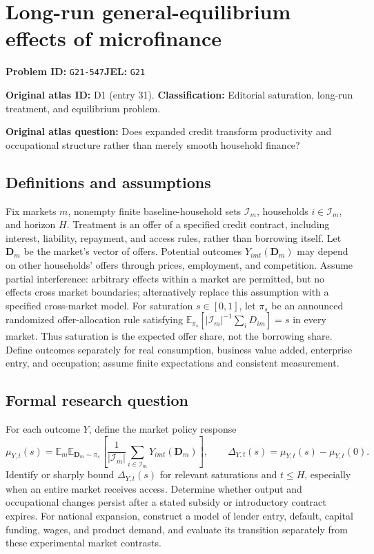 \documentclass[11pt,a4paper]{article}
\begin{document}
\section*{Long-run general-equilibrium effects of microfinance}
\textbf{Problem ID:} \texttt{G21-547}\quad \textbf{JEL:} \texttt{G21}\par
\label{problem:OP-0031}
\label{atlas:prob:D1}
\noindent\textbf{Original atlas ID:} D1 (entry 31). \textbf{Classification:} Editorial saturation, long-run treatment, and equilibrium problem.

\noindent\textbf{Original atlas question:} Does expanded credit transform productivity and occupational structure rather than merely smooth household finance?

\subsection*{Definitions and assumptions}
Fix markets $m$, nonempty finite baseline-household sets $\mathcal I_m$, households $i\in\mathcal I_m$, and horizon $H$. Treatment is an offer of a specified credit contract, including interest, liability, repayment, and access rules, rather than borrowing itself. Let $\mathbf D_m$ be the market's vector of offers. Potential outcomes $Y_{imt}(\mathbf D_m)$ may depend on other households' offers through prices, employment, and competition. Assume partial interference: arbitrary effects within a market are permitted, but no effects cross market boundaries; alternatively replace this assumption with a specified cross-market model. For saturation $s\in[0,1]$, let $\pi_s$ be an announced randomized offer-allocation rule satisfying $\mathbb E_{\pi_s}[|\mathcal I_m|^{-1}\sum_i D_{im}]=s$ in every market. Thus saturation is the expected offer share, not the borrowing share. Define outcomes separately for real consumption, business value added, enterprise entry, and occupation; assume finite expectations and consistent measurement.
\subsection*{Formal research question}
For each outcome $Y$, define the market policy response
\[
 \mu_{Y,t}(s)=\mathbb E_m\mathbb E_{\mathbf D_m\sim\pi_s}
          \left[\frac1{|\mathcal I_m|}\sum_{i\in\mathcal I_m}
                    Y_{imt}(\mathbf D_m)\right],
 \qquad \Delta_{Y,t}(s)=\mu_{Y,t}(s)-\mu_{Y,t}(0).
\]
Identify or sharply bound $\Delta_{Y,t}(s)$ for relevant saturations and $t\leq H$, especially when an entire market receives access. Determine whether output and occupational changes persist after a stated subsidy or introductory contract expires. For national expansion, construct a model of lender entry, default, capital funding, wages, and product demand, and evaluate its transition separately from these experimental market contrasts.
\end{document}
